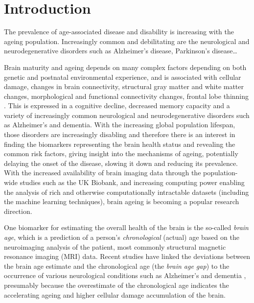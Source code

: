 \chapter{Introduction}


The prevalence of age-associated disease and disability is increasing with the ageing population. Increasingly common and debilitating are the neurological and neurodegenerative disorders such as Alzheimer's disease, Parkinson's disease\dots

Brain maturity and ageing depends on many complex factors depending on both genetic and postnatal environmental experience, and is associated with cellular damage, changes in brain connectivity, structural gray matter and white matter changes, morphological and functional connectivity changes, frontal lobe thinning \cite{cole2018brain, niu2019improved, franke2019ten}. This is expressed in a cognitive decline, decreased memory capacity and a variety of increasingly common neurological and neurodegenerative disorders such as Alzheimer's and dementia. With the increasing global population lifespan, those disorders are increasingly disabling and therefore there is an interest in finding the biomarkers representing the brain health status and revealing the common risk factors, giving insight into the mechanisms of ageing, potentially delaying the onset of the disease, slowing it down and reducing its prevalence. With the increased availability of brain imaging data through the population-wide studies such as the UK Biobank, and increasing computing power enabling the analysis of rich and otherwise computationally intractable datasets (including the machine learning techniques), brain ageing is becoming a popular research direction.

One biomarker for estimating the overall health of the brain is the so-called \textit{brain age}, which is a prediction of a person's \textit{chronological} (actual) age based on the neuroimaging analysis of the patient, most commonly structural magnetic resonance imaging (MRI) data. Recent studies have linked the deviations between the brain age estimate and the chronological age (the \textit{brain age gap}) to the occurrence of various neurological conditions such as Alzheimer's and dementia \cite{kaufmann2019}, presumably because the overestimate of the chronological age indicates the accelerating ageing and higher cellular damage accumulation of the brain.

